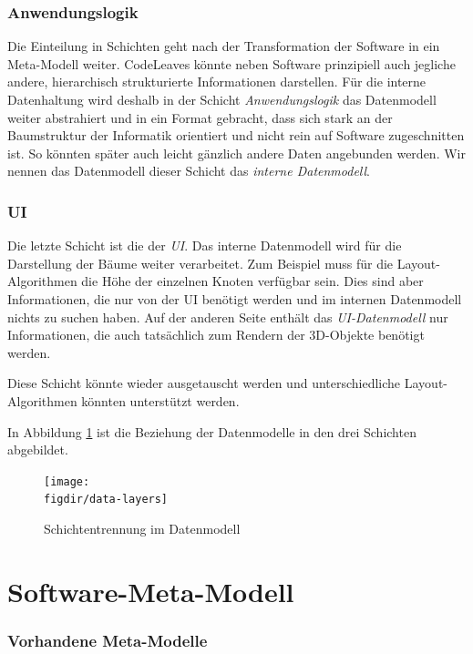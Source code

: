 \subsubsection*{Anwendungslogik}
Die Einteilung in Schichten geht nach der Transformation der Software in ein Meta-Modell weiter. CodeLeaves könnte neben Software prinzipiell auch jegliche andere, hierarchisch strukturierte Informationen darstellen. Für die interne Datenhaltung wird deshalb in der Schicht \textit{Anwendungslogik} das Datenmodell weiter abstrahiert und in ein Format gebracht, dass sich stark an der Baumstruktur der Informatik orientiert und nicht rein auf Software zugeschnitten ist. So könnten später auch leicht gänzlich andere Daten angebunden werden. Wir nennen das Datenmodell dieser Schicht das \textit{interne Datenmodell}.

\subsubsection*{UI}
Die letzte Schicht ist die der \textit{UI}. Das interne Datenmodell wird für die Darstellung der Bäume weiter verarbeitet. Zum Beispiel muss für die Layout-Algorithmen die Höhe der einzelnen Knoten verfügbar sein. Dies sind aber Informationen, die nur von der UI benötigt werden und im internen Datenmodell nichts zu suchen haben. Auf der anderen Seite enthält das \textit{UI-Datenmodell} nur Informationen, die auch tatsächlich zum Rendern der 3D-Objekte benötigt werden.

Diese Schicht könnte wieder ausgetauscht werden und unterschiedliche Layout-Algorithmen könnten unterstützt werden.

In Abbildung \ref{fig:data-layers} ist die Beziehung der Datenmodelle in den drei Schichten abgebildet.

\begin{figure}[htb]
  \texttt{[image: \\figdir/data-layers]}
  \caption{Schichtentrennung im Datenmodell}
  \label{fig:data-layers}
\end{figure}

\section{Software-Meta-Modell}
\label{sec:software-model}

\subsubsection*{Vorhandene Meta-Modelle}

